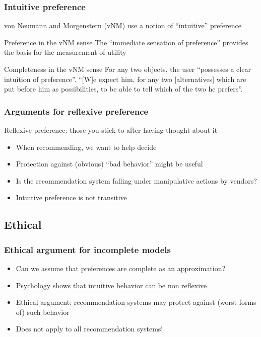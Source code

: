 \documentclass[french,english]{beamer}
\begin{document}
\begin{frame}
	\frametitle{Intuitive preference}
	von Neumann and Morgenstern (vNM) use a notion of “intuitive” preference
	\begin{block}{Preference in the vNM sense \citep{fishburn_retrospective_1989}}
		The “immediate sensation of preference” provides the basis for the measurement of utility
	\end{block}
	\begin{block}{Completeness in the vNM sense}
		For any two objects, the user “possesses a clear intuition of preference”. “[W]e expect him, for any two [alternatives] which are put before him as possibilities, to be able to tell which of the two he prefers”.
	\end{block}
\end{frame}

\begin{frame}
	\frametitle{Arguments for reflexive preference}
	Reflexive preference: those you stick to after having thought about it
	\begin{itemize}
		\item When recommending, we want to help decide
		\item Protection against (obvious) “bad behavior” might be useful
		\item Is the recommendation system falling under manipulative actions by vendors?
		\item Intuitive preference is not transitive \citep{mandler_difficult_2001}
	\end{itemize}
\end{frame}

\subsection{Ethical}
\begin{frame}
	\frametitle{Ethical argument for incomplete models}
	\begin{itemize}
		\item Can we assume that preferences are complete as an approximation?
		\item Psychology shows that intuitive behavior can be non reflexive
		\item Ethical argument: recommendation systems may protect against (worst forms of) such behavior
		\item Does not apply to all recommendation systems!
	\end{itemize}
\end{frame}
\end{document}
